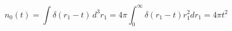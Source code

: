 \begin{equation}\label{eq2}
n_{0}(t) = \int\delta(r_{1}-t)\,
d^{3}r_{1}=4\pi \int_0^{\infty}\delta(r_{1}-t)r_{1}^2 dr_{1}=4\pi t^2
\end{equation}

